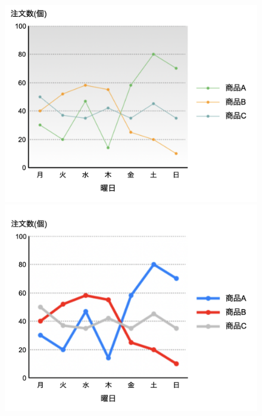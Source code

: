\begin{figure}[H]
    \centering
    \begin{minipage}[b]{.49\columnwidth}
        \centering
        \includegraphics[keepaspectratio,width=\textwidth]{../../10_UniversalDesign/no2_line_original.png}
    \end{minipage}
    \begin{minipage}[b]{.49\columnwidth}
        \centering
        \includegraphics[keepaspectratio,width=\textwidth]{../../10_UniversalDesign/no2_line_reviced.png}
    \end{minipage}

\end{figure}
